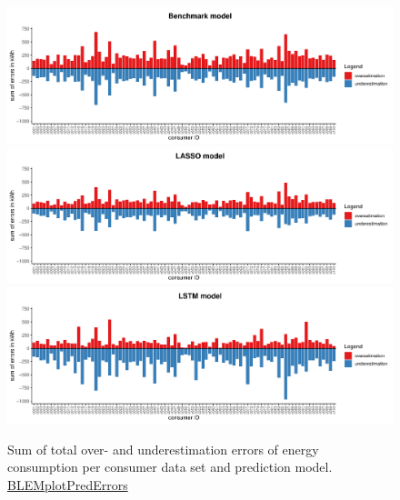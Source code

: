\begin{figure}
    \centering
    \includegraphics[width=\textwidth]{thesis/graphs/evaluation/c_barplot_naive_overunderestimation.pdf}\\\vspace{.6cm}
    \includegraphics[width=\textwidth]{thesis/graphs/evaluation/c_barplot_LASSO_overunderestimation.pdf}\\\vspace{.6cm}
    \includegraphics[width=\textwidth]{thesis/graphs/evaluation/c_barplot_LSTM_overunderestimation.pdf}
    \caption[Sum of total over- and underestimation errors per consumer data set]{Sum of total over- and underestimation errors of energy consumption per consumer data set and prediction model. \quantnet\href{https://github.com/QuantLet/BLEM/tree/master/BLEMplotPredErrors}{BLEMplotPredErrors}}
    \label{Fig:overunderestimation}
\end{figure}
% 

